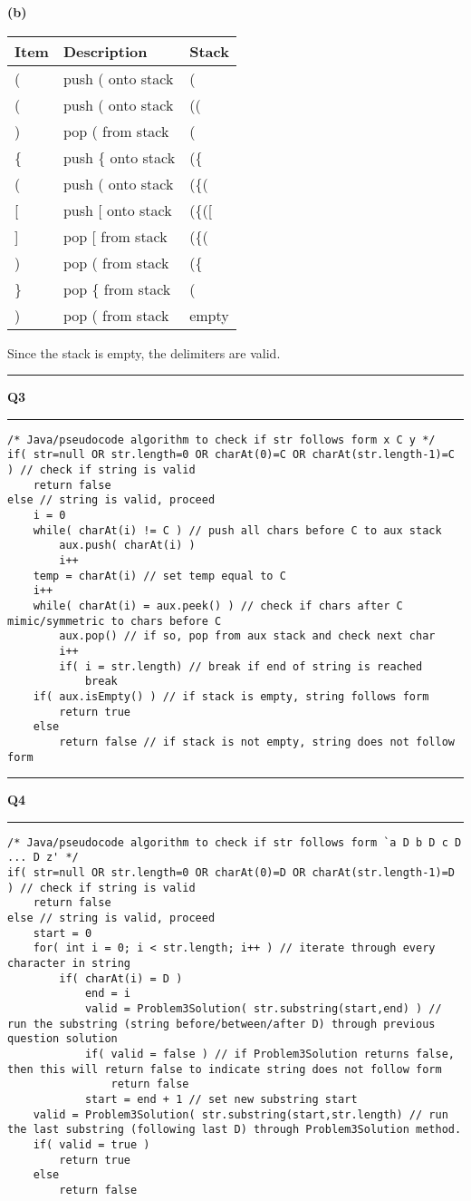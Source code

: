 \documentclass[11pt]{article}
\newcommand\question[2]{\vspace{.25in}\hrule\textbf{#1 #2}\vspace{.5em}\hrule\vspace{.10in}}
\renewcommand\part[1]{\vspace{.10in}\textbf{(#1)}}
\begin{document}
\part{b}
\begin{table}[!htbp]
\centering
\begin{tabular}{lll}
Item & Description         & Stack   \\ \hline
(    & push ( onto stack   & (       \\
(    & push ( onto stack   & ((      \\
)    & pop ( from stack    & (       \\
\{   & push \{ onto stack  & (\{     \\
(    & push ( onto stack   & (\{(    \\
{[}  & push {[} onto stack & (\{({[} \\
{]}  & pop {[} from stack  & (\{(    \\
)    & pop ( from stack    & (\{     \\
\}   & pop \{ from stack   & (       \\
)    & pop ( from stack    & empty  
\end{tabular}
\end{table}
Since the stack is empty, the delimiters are valid.
\FloatBarrier

\newpage
\question{Q3}{} 
\begin{lstlisting}
/* Java/pseudocode algorithm to check if str follows form x C y */
if( str=null OR str.length=0 OR charAt(0)=C OR charAt(str.length-1)=C ) // check if string is valid
	return false
else // string is valid, proceed
	i = 0
	while( charAt(i) != C ) // push all chars before C to aux stack
		aux.push( charAt(i) )
		i++
	temp = charAt(i) // set temp equal to C
	i++
	while( charAt(i) = aux.peek() ) // check if chars after C mimic/symmetric to chars before C
		aux.pop() // if so, pop from aux stack and check next char
		i++
		if( i = str.length) // break if end of string is reached
			break
	if( aux.isEmpty() ) // if stack is empty, string follows form
		return true
	else
		return false // if stack is not empty, string does not follow form
\end{lstlisting}

\newpage
\question{Q4}{} 
\begin{lstlisting}
/* Java/pseudocode algorithm to check if str follows form `a D b D c D ... D z' */
if( str=null OR str.length=0 OR charAt(0)=D OR charAt(str.length-1)=D ) // check if string is valid
	return false
else // string is valid, proceed
	start = 0
	for( int i = 0; i < str.length; i++ ) // iterate through every character in string
		if( charAt(i) = D ) 
			end = i
			valid = Problem3Solution( str.substring(start,end) ) // run the substring (string before/between/after D) through previous question solution
			if( valid = false ) // if Problem3Solution returns false, then this will return false to indicate string does not follow form
				return false
			start = end + 1 // set new substring start
	valid = Problem3Solution( str.substring(start,str.length) // run the last substring (following last D) through Problem3Solution method.
	if( valid = true )
		return true
	else
		return false
\end{lstlisting}
\end{document}
